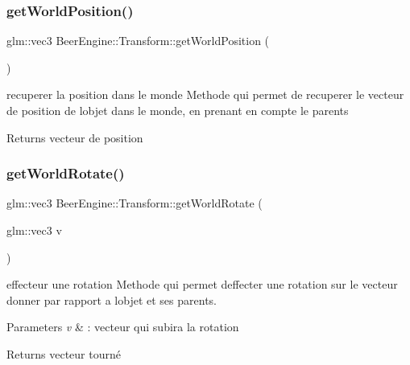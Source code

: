 \subsubsection{\texorpdfstring{get\+World\+Position()}{getWorldPosition()}}
{\footnotesize\ttfamily glm\+::vec3 Beer\+Engine\+::\+Transform\+::get\+World\+Position (\begin{DoxyParamCaption}{ }\end{DoxyParamCaption})}



recuperer la position dans le monde Methode qui permet de recuperer le vecteur de position de l\textquotesingle{}objet dans le monde, en prenant en compte le parents 

\begin{DoxyReturn}{Returns}
vecteur de position 
\end{DoxyReturn}
\mbox{\label{class_beer_engine_1_1_transform_a7aaf81b4672307edc39e9b208430ec59}} 
\subsubsection{\texorpdfstring{get\+World\+Rotate()}{getWorldRotate()}}
{\footnotesize\ttfamily glm\+::vec3 Beer\+Engine\+::\+Transform\+::get\+World\+Rotate (\begin{DoxyParamCaption}\item[{glm\+::vec3}]{v }\end{DoxyParamCaption})}



effecteur une rotation Methode qui permet d\textquotesingle{}effecter une rotation sur le vecteur donner par rapport a l\textquotesingle{}objet et ses parents. 


\begin{DoxyParams}{Parameters}
{\em v} & \+: vecteur qui subira la rotation \\
\hline
\end{DoxyParams}
\begin{DoxyReturn}{Returns}
vecteur tourné 
\end{DoxyReturn}
\mbox{\label{class_beer_engine_1_1_transform_a5344e1be69d47951f434efdd7788ab4b}} 
